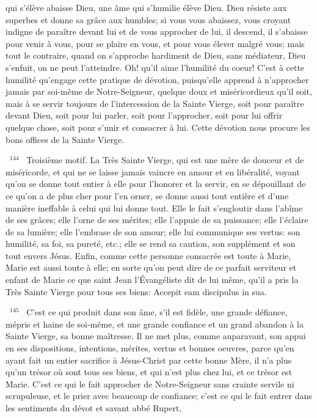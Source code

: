 \documentclass[paper=a5,pagesize=pdftex,fontsize=15pt,headinclude=on,twoside=off]{scrbook}
\newcommand{\negphantom}[1]{\settowidth{\dimen0}{#1}\hspace*{-\dimen0}}
\newcommand{\versenb}[1]{\par \vspace{10pt}~\negphantom{~${}^{#1}$~}${}^{#1}$~}
\begin{document}
qui s'élève abaisse Dieu, une âme qui s'humilie élève Dieu. Dieu résiste aux superbes et donne sa grâce aux
humbles; si vous vous abaissez, vous croyant indigne de paraître devant lui et de vous approcher de lui, il
descend, il s'abaisse pour venir à vous, pour se plaire en vous, et pour vous élever malgré vous; mais tout le
contraire, quand on s'approche hardiment de Dieu, sans médiateur, Dieu s'enfuit, on ne peut l'atteindre. Oh! qu'il
aime l'humilité du coeur! C'est à cette humilité qu'engage cette pratique de dévotion, puisqu'elle apprend à
n'approcher jamais par soi-même de Notre-Seigneur, quelque doux et miséricordieux qu'il soit, mais à se servir
toujours de l'intercession de la Sainte Vierge, soit pour paraître devant Dieu, soit pour lui parler, soit pour
l'approcher, soit pour lui offrir quelque chose, soit pour s'unir et consacrer à lui.
Cette dévotion nous procure les bons offices de la Sainte Vierge.
\versenb{144} Troisième motif. La Très Sainte Vierge, qui est une mère de douceur et de miséricorde, et qui ne se laisse
jamais vaincre en amour et en libéralité, voyant qu'on se donne tout entier à elle pour l'honorer et la servir, en se
dépouillant de ce qu'on a de plus cher pour l'en orner, se donne aussi tout entière et d'une manière ineffable à
celui qui lui donne tout. Elle le fait s'engloutir dans l'abîme de ses grâces; elle l'orne de ses mérites; elle l'appuie de
sa puissance; elle l'éclaire de sa lumière; elle l'embrase de son amour; elle lui communique ses vertus: son
humilité, sa foi, sa pureté, etc.; elle se rend sa caution, son supplément et son tout envers Jésus. Enfin, comme
cette personne consacrée est toute à Marie, Marie est aussi toute à elle; en sorte qu'on peut dire de ce parfait
serviteur et enfant de Marie ce que saint Jean l'Évangéliste dit de lui même, qu'il a pris la Très Sainte Vierge pour
tous ses biens: Accepit eam discipulus in sua.
\versenb{145} C'est ce qui produit dans son âme, s'il est fidèle, une grande défiance, mépris et haine de soi-même, et une
grande confiance et un grand abandon à la Sainte Vierge, sa bonne maîtresse. Il ne met plus, comme auparavant,
son appui en ses dispositions, intentions, mérites, vertus et bonnes oeuvres, parce qu'en ayant fait un entier
sacrifice à Jésus-Christ par cette bonne Mère, il n'a plus qu'un trésor où sont tous ses biens, et qui n'est plus chez
lui, et ce trésor est Marie. C'est ce qui le fait approcher de Notre-Seigneur sans crainte servile ni scrupuleuse, et le
prier avec beaucoup de confiance; c'est ce qui le fait entrer dans les sentiments du dévot et savant abbé Rupert,
\end{document}
